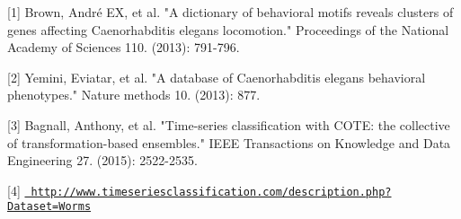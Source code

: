 \mbox{[}1\mbox{]} Brown, André EX, et al. "{}\+A dictionary of behavioral motifs reveals clusters of genes affecting Caenorhabditis elegans locomotion."{} Proceedings of the National Academy of Sciences 110. (2013)\+: 791-\/796.

\mbox{[}2\mbox{]} Yemini, Eviatar, et al. "{}\+A database of Caenorhabditis elegans behavioral phenotypes."{} Nature methods 10. (2013)\+: 877.

\mbox{[}3\mbox{]} Bagnall, Anthony, et al. "{}\+Time-\/series classification with COTE\+: the collective of transformation-\/based ensembles."{} IEEE Transactions on Knowledge and Data Engineering 27. (2015)\+: 2522-\/2535.

\mbox{[}4\mbox{]} \href{http://www.timeseriesclassification.com/description.php?Dataset=Worms}{\texttt{ http\+://www.\+timeseriesclassification.\+com/description.\+php?\+Dataset=\+Worms}} 